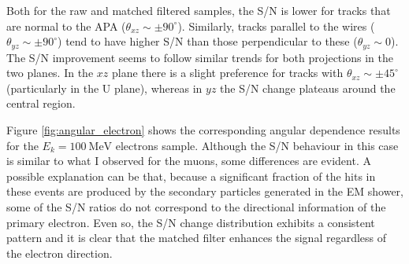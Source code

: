 Both for the raw and matched filtered samples, the S/N is lower for tracks that are normal to the APA ($\theta_{xz} \sim \pm 90^{\circ}$). Similarly, tracks parallel to the wires ($\theta_{yz} \sim \pm 90^{\circ}$) tend to have higher S/N than those perpendicular to these ($\theta_{yz} \sim 0$). The S/N improvement seems to follow similar trends for both projections in the two planes. In the $xz$ plane there is a slight preference for tracks with $\theta_{xz} \sim \pm 45^{\circ}$ (particularly in the U plane), whereas in $yz$ the S/N change plateaus around the central region.

Figure \ref{fig:angular_electron} shows the corresponding angular dependence results for the $E_{k}=100 \ \mathrm{MeV}$ electrons sample. Although the S/N behaviour in this case is similar to what I observed for the muons, some differences are evident. A possible explanation can be that, because a significant fraction of the hits in these events are produced by the secondary particles generated in the EM shower, some of the S/N ratios do not correspond to the directional information of the primary electron. Even so, the S/N change distribution exhibits a consistent pattern and it is clear that the matched filter enhances the signal regardless of the electron direction.

